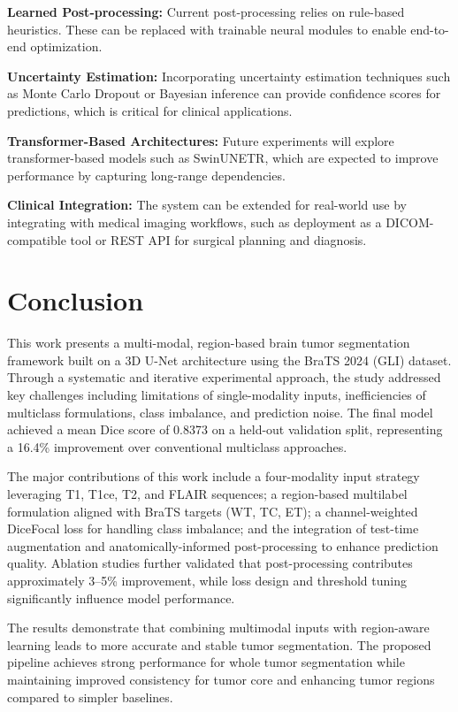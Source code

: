 \documentclass[conference]{IEEEtran}
\begin{document}
\textbf{Learned Post-processing:}  
Current post-processing relies on rule-based heuristics. These can be replaced with trainable neural modules to enable end-to-end optimization.

\textbf{Uncertainty Estimation:}  
Incorporating uncertainty estimation techniques such as Monte Carlo Dropout or Bayesian inference can provide confidence scores for predictions, which is critical for clinical applications.

\textbf{Transformer-Based Architectures:}  
Future experiments will explore transformer-based models such as SwinUNETR, which are expected to improve performance by capturing long-range dependencies.

\textbf{Clinical Integration:}  
The system can be extended for real-world use by integrating with medical imaging workflows, such as deployment as a DICOM-compatible tool or REST API for surgical planning and diagnosis.

\section{Conclusion}

This work presents a multi-modal, region-based brain tumor segmentation framework built on a 3D U-Net architecture using the BraTS 2024 (GLI) dataset. Through a systematic and iterative experimental approach, the study addressed key challenges including limitations of single-modality inputs, inefficiencies of multiclass formulations, class imbalance, and prediction noise. The final model achieved a mean Dice score of 0.8373 on a held-out validation split, representing a 16.4\% improvement over conventional multiclass approaches.

The major contributions of this work include a four-modality input strategy leveraging T1, T1ce, T2, and FLAIR sequences; a region-based multilabel formulation aligned with BraTS targets (WT, TC, ET); a channel-weighted DiceFocal loss for handling class imbalance; and the integration of test-time augmentation and anatomically-informed post-processing to enhance prediction quality. Ablation studies further validated that post-processing contributes approximately 3--5\% improvement, while loss design and threshold tuning significantly influence model performance.

The results demonstrate that combining multimodal inputs with region-aware learning leads to more accurate and stable tumor segmentation. The proposed pipeline achieves strong performance for whole tumor segmentation while maintaining improved consistency for tumor core and enhancing tumor regions compared to simpler baselines.
\end{document}
